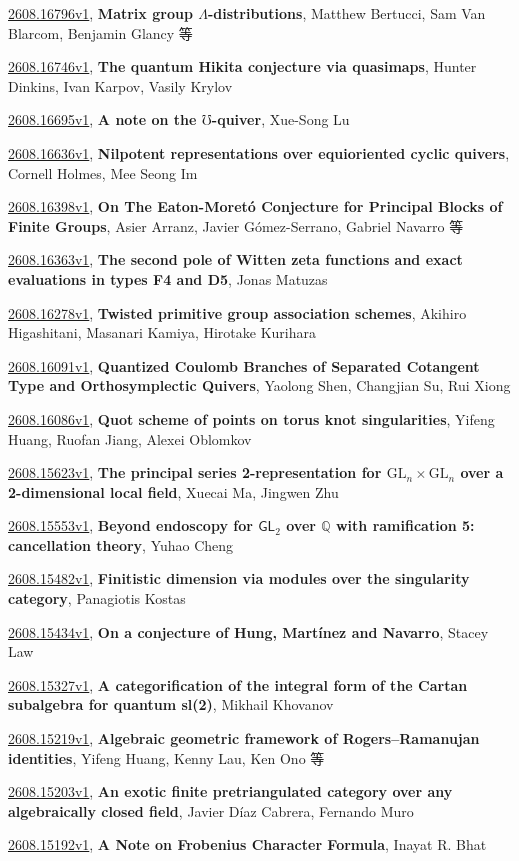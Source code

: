 \documentclass[9pt, a4paper]{article}
\theoremstyle{plain}
\theoremstyle{definition}
\theoremstyle{remark}
\newcommand{\arxiv}[3]{\href{https://arxiv.org/abs/#1}{#1}, \textbf{\textcolor{arxivblue}{#2}}, #3}
\begin{document}
\arxiv{2608.16796v1}{Matrix group $Λ$-distributions}{Matthew Bertucci, Sam Van Blarcom, Benjamin Glancy 等}

\arxiv{2608.16746v1}{The quantum Hikita conjecture via quasimaps}{Hunter Dinkins, Ivan Karpov, Vasily Krylov}

\arxiv{2608.16695v1}{A note on the $\mho$-quiver}{Xue-Song Lu}

\arxiv{2608.16636v1}{Nilpotent representations over equioriented cyclic quivers}{Cornell Holmes, Mee Seong Im}

\arxiv{2608.16398v1}{On The Eaton-Moretó Conjecture for Principal Blocks of Finite Groups}{Asier Arranz, Javier Gómez-Serrano, Gabriel Navarro 等}

\arxiv{2608.16363v1}{The second pole of Witten zeta functions and exact evaluations in types F4 and D5}{Jonas Matuzas}

\arxiv{2608.16278v1}{Twisted primitive group association schemes}{Akihiro Higashitani, Masanari Kamiya, Hirotake Kurihara}

\arxiv{2608.16091v1}{Quantized Coulomb Branches of Separated Cotangent Type and Orthosymplectic Quivers}{Yaolong Shen, Changjian Su, Rui Xiong}

\arxiv{2608.16086v1}{Quot scheme of points on torus knot singularities}{Yifeng Huang, Ruofan Jiang, Alexei Oblomkov}

\arxiv{2608.15623v1}{The principal series 2-representation for $\mathrm{GL}_n\times\mathrm{GL}_n$ over a 2-dimensional local field}{Xuecai Ma, Jingwen Zhu}

\arxiv{2608.15553v1}{Beyond endoscopy for $\mathsf{GL}_2$ over $\mathbb{Q}$ with ramification 5: cancellation theory}{Yuhao Cheng}

\arxiv{2608.15482v1}{Finitistic dimension via modules over the singularity category}{Panagiotis Kostas}

\arxiv{2608.15434v1}{On a conjecture of Hung, Martínez and Navarro}{Stacey Law}

\arxiv{2608.15327v1}{A categorification of the integral form of the Cartan subalgebra for quantum sl(2)}{Mikhail Khovanov}

\arxiv{2608.15219v1}{Algebraic geometric framework of Rogers--Ramanujan identities}{Yifeng Huang, Kenny Lau, Ken Ono 等}

\arxiv{2608.15203v1}{An exotic finite pretriangulated category over any algebraically closed field}{Javier Díaz Cabrera, Fernando Muro}

\arxiv{2608.15192v1}{A Note on Frobenius Character Formula}{Inayat R. Bhat}
\end{document}
